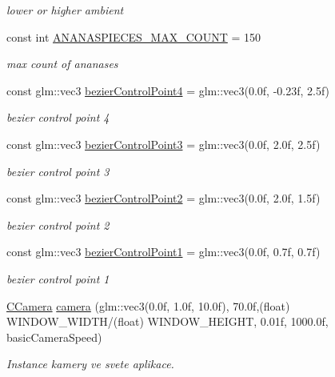 \begin{DoxyCompactItemize}
\begin{DoxyCompactList}\small\item\em lower or higher ambient \end{DoxyCompactList}\item 
const int \mbox{\hyperlink{namespacekrizpav6_a6da7ffd420b1d3b42349d28d68850520}{A\+N\+A\+N\+A\+S\+P\+I\+E\+C\+E\+S\+\_\+\+M\+A\+X\+\_\+\+C\+O\+U\+NT}} = 150
\begin{DoxyCompactList}\small\item\em max count of ananases \end{DoxyCompactList}\item 
const glm\+::vec3 \mbox{\hyperlink{namespacekrizpav6_add565cdbdac84919dfd3ecc10ed27502}{bezier\+Control\+Point4}} = glm\+::vec3(0.\+0f, -\/0.\+23f, 2.\+5f)
\begin{DoxyCompactList}\small\item\em bezier control point 4 \end{DoxyCompactList}\item 
const glm\+::vec3 \mbox{\hyperlink{namespacekrizpav6_aed8a4be355e210b8bb7b23d0b2ef8355}{bezier\+Control\+Point3}} = glm\+::vec3(0.\+0f, 2.\+0f, 2.\+5f)
\begin{DoxyCompactList}\small\item\em bezier control point 3 \end{DoxyCompactList}\item 
const glm\+::vec3 \mbox{\hyperlink{namespacekrizpav6_a54b795bfc7a32943c80e912cba91c335}{bezier\+Control\+Point2}} = glm\+::vec3(0.\+0f, 2.\+0f, 1.\+5f)
\begin{DoxyCompactList}\small\item\em bezier control point 2 \end{DoxyCompactList}\item 
const glm\+::vec3 \mbox{\hyperlink{namespacekrizpav6_a213943a0ef62f1dd281b843bafcea43e}{bezier\+Control\+Point1}} = glm\+::vec3(0.\+0f, 0.\+7f, 0.\+7f)
\begin{DoxyCompactList}\small\item\em bezier control point 1 \end{DoxyCompactList}\item 
\mbox{\hyperlink{class_c_camera}{C\+Camera}} \mbox{\hyperlink{namespacekrizpav6_a29ec3a9ac3955a973f09e9c4afcf3efa}{camera}} (glm\+::vec3(0.\+0f, 1.\+0f, 10.\+0f), 70.\+0f,(float) W\+I\+N\+D\+O\+W\+\_\+\+W\+I\+D\+T\+H/(float) W\+I\+N\+D\+O\+W\+\_\+\+H\+E\+I\+G\+H\+T, 0.\+01f, 1000.\+0f, basic\+Camera\+Speed)
\begin{DoxyCompactList}\small\item\em Instance kamery ve svete aplikace. \end{DoxyCompactList}\item 

\end{DoxyCompactItemize}
